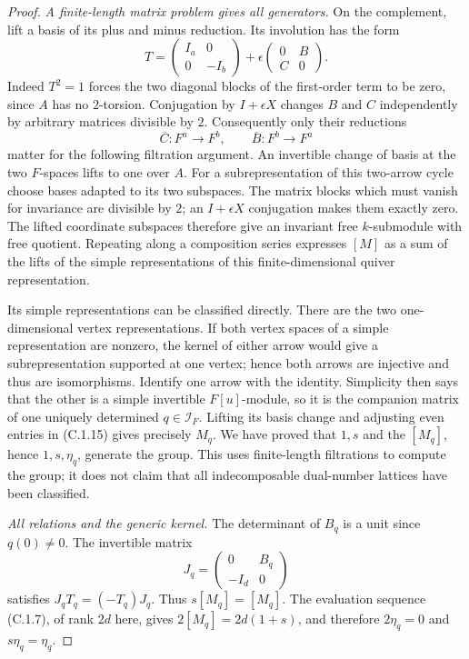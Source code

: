 \begin{proof}
\emph{A finite-length matrix problem gives all generators.}
On the complement, lift a basis of its plus and minus reduction.
Its involution has the form
\[
 T=\begin{pmatrix}I_a&0\\0&-I_b\end{pmatrix}
    +\epsilon\begin{pmatrix}0&B\\ C&0\end{pmatrix}.    \tag{C.1.15}
\]
Indeed $T^2=1$ forces the two diagonal blocks of the first-order
term to be zero, since $A$ has no $2$-torsion.
Conjugation by $I+\epsilon X$ changes $B$ and $C$ independently
by arbitrary matrices divisible by $2$. Consequently only
their reductions
\[
 \overline C:F^a\longrightarrow F^b,\qquad
 \overline B:F^b\longrightarrow F^a
\]
matter for the following filtration argument. An invertible
change of basis at the two $F$-spaces lifts to one over $A$.
For a subrepresentation of this two-arrow cycle choose bases
adapted to its two subspaces. The matrix blocks which must vanish
for invariance are divisible by $2$; an $I+\epsilon X$
conjugation makes them exactly zero. The lifted coordinate
subspaces therefore give an invariant free $k$-submodule with
free quotient. Repeating along a composition series expresses
$[M]$ as a sum of the lifts of the simple representations of
this finite-dimensional quiver representation.

Its simple representations can be classified directly. There
are the two one-dimensional vertex representations. If both
vertex spaces of a simple representation are nonzero, the
kernel of either arrow would give a subrepresentation supported
at one vertex; hence both arrows are injective and thus are
isomorphisms. Identify one arrow with the identity. Simplicity
then says that the other is a simple invertible $F[u]$-module,
so it is the companion matrix of one uniquely determined
$q\in\mathcal I_F$. Lifting its basis change and adjusting even
entries in (C.1.15) gives precisely $M_q$. We have proved that
$1,s$ and the $[M_q]$, hence $1,s,\eta_q$, generate the group.
This uses finite-length filtrations to compute the group; it
does not claim that all indecomposable dual-number lattices
have been classified.

\emph{All relations and the generic kernel.}
The determinant of $B_q$ is a unit since $q(0)\ne0$.
The invertible matrix
\[
 J_q=\begin{pmatrix}0&B_q\\-I_d&0\end{pmatrix}
\]
satisfies $J_qT_q=(-T_q)J_q$. Thus $s[M_q]=[M_q]$.
The evaluation sequence (C.1.7), of rank $2d$ here, gives
$2[M_q]=2d(1+s)$, and therefore $2\eta_q=0$ and
$s\eta_q=\eta_q$.


\end{proof}
